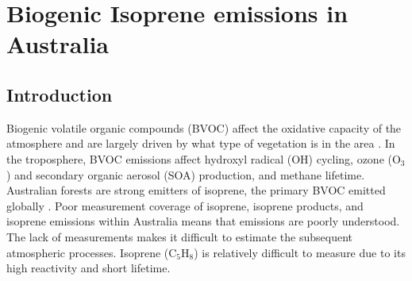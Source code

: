 
%
%



\chapter{Biogenic Isoprene emissions in Australia} %
\label{BioIsop}
  
\section{Introduction}  
\label{BioIsop:intro}  
  
  
  
  Biogenic volatile organic compounds (BVOC) affect the oxidative capacity of the atmosphere and are largely driven by what type of vegetation is in the area \parencite{Kefauver2014}.
  In the troposphere, BVOC emissions affect hydroxyl radical (OH) cycling, ozone (O$_3$) and secondary organic aerosol (SOA) production, and methane lifetime.
  Australian forests are strong emitters of isoprene, the primary BVOC emitted globally \parencite{Guenther2006,Messina2016}. %
  Poor measurement coverage of isoprene, isoprene products, and isoprene emissions within Australia means that emissions are poorly understood.
  The lack of measurements makes it difficult to estimate the subsequent atmospheric processes. 
  Isoprene (C$_5$H$_8$) is relatively difficult to measure due to its high reactivity and short lifetime.
  
